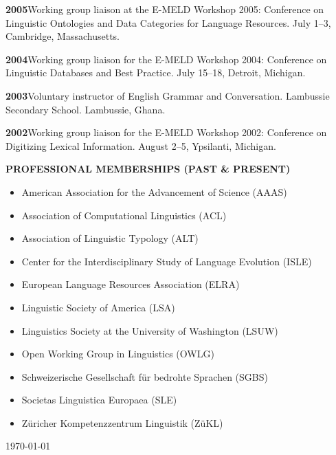 \documentclass[11pt]{article}
\newcommand{\hangpara}{
 \setlength{\parindent}{0in} %
 \hangindent=0.42in %
}
\begin{document}
\vskip 6pt
\hangpara
{\bf 2005}\hspace{1ex}Working group liaison at the E-MELD Workshop 2005: Conference on Linguistic Ontologies and Data Categories for Language Resources. July 1--3, Cambridge, Massachusetts.

\vskip 6pt
\hangpara
{\bf 2004}\hspace{1ex}Working group liaison for the E-MELD Workshop 2004: Conference on Linguistic Databases and Best Practice. July 15--18, Detroit, Michigan.

\vskip 6pt
\hangpara
{\bf 2003}\hspace{1ex}Voluntary instructor of English Grammar and Conversation. Lambussie Secondary School. Lambussie, Ghana.

\vskip 6pt
\hangpara
{\bf 2002}\hspace{1ex}Working group liaison for the E-MELD Workshop 2002: Conference on Digitizing Lexical Information. August 2--5, Ypsilanti, Michigan.



\vskip 20pt
\begin{flushleft}
{\bf PROFESSIONAL MEMBERSHIPS (PAST \& PRESENT)}
\end{flushleft}
\begin{itemize}
\item American Association for the Advancement of Science (AAAS)
\item Association of Computational Linguistics (ACL)
\item Association of Linguistic Typology (ALT)
\item Center for the Interdisciplinary Study of Language Evolution (ISLE)
\item European Language Resources Association (ELRA)
\item Linguistic Society of America (LSA)
\item Linguistics Society at the University of Washington (LSUW)
\item Open Working Group in Linguistics (OWLG)
\item Schweizerische Gesellschaft f{\"u}r bedrohte Sprachen (SGBS)
\item Societas Linguistica Europaea (SLE)
\item Z{\"u}richer Kompetenzzentrum Linguistik (Z{\"u}KL)
\end{itemize}

\vskip 20pt
\today
\end{document}

